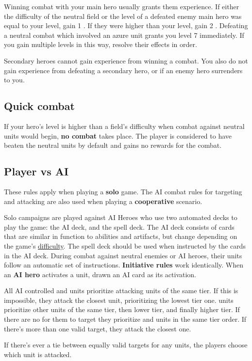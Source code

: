 \documentclass[12pt]{article}
\def\assets{assets}
\def\svgs{\assets/svgs}
\begin{document}
Winning combat with your main hero usually grants them experience. If either the difficulty of the neutral field or the level of a defeated enemy main hero was equal to your level, gain 1 . If they were higher than your level, gain 2 . Defeating a neutral combat which involved an azure  unit grants you level 7 immediately. If you gain multiple levels in this way, resolve their effects in order.\par
Secondary heroes cannot gain experience from winning a combat. You also do not gain experience from defeating a secondary hero, or if an enemy hero surrenders to you.
\subsection*{\hypertarget{Quick}{Quick combat}}
If your hero’s level is higher than a field’s difficulty when combat against neutral units would begin, \textbf{no combat} takes place. The player is considered to have beaten the neutral units by default and gains no rewards for the combat.

\subsection*{\hypertarget{AIrules}{Player vs AI}}
These rules apply when playing a \textbf{solo} game. The AI combat rules for targeting and attacking are also used when playing a \textbf{cooperative} scenario.\par
Solo campaigns are played against AI Heroes who use two automated decks to play the game: the AI deck, and the spell deck. The AI deck consists of cards that are similar in function to abilities and artifacts, but change depending on the game's \hyperlink{Difficulty}{difficulty}. The spell deck should be used
when instructed by the cards in the AI deck. During combat against neutral enemies or AI heroes, their units follow an automatic set of instructions. \textbf{Initiative rules} work identically. When an \textbf{AI hero} activates a unit, drawn an AI card as its activation.\par
All AI controlled  and  units prioritize attacking units of the same tier. If this is impossible, they attack the closest unit, prioritizing the lowest tier one.  units prioritize other  units of the same tier, then lower tier, and finally higher tier. If there are no  for them to target they prioritize  and  units in the same tier order. If there's more than one valid target, they attack the closest one.\par
If there's ever a tie between equally valid targets for any units, the players choose which unit is attacked.
\end{document}
